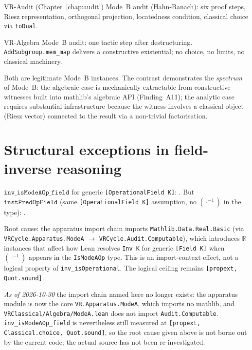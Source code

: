\begin{remark}
\label{rem:modeB_contrast}
\leanok
{}
VR-Audit (Chapter~\ref{chap:audit}) Mode~B audit (Hahn-Banach): six
proof steps, Riesz representation, orthogonal projection, locatedness
condition, classical choice via \texttt{toDual}.

VR-Algebra Mode~B audit: one tactic step after destructuring.
\texttt{AddSubgroup.mem\_map} delivers a constructive existential;
no choice, no limits, no classical machinery.

Both are legitimate Mode~B instances.  The contrast demonstrates the
\emph{spectrum} of Mode~B: the algebraic case is mechanically extractable
from constructive witnesses built into mathlib's algebraic API (Finding~A11);
the analytic case requires substantial infrastructure because the witness
involves a classical object (Riesz vector) connected to the result via
a non-trivial factorisation.
\end{remark}

\section{Structural exceptions in field-inverse reasoning}
\label{sec:algebra_exceptions}

\begin{remark}
\label{rem:A15}
\leanok
{}
$\texttt{inv\_isModeAOp\_field}$ for generic \texttt{[OperationalField K]}:
.
But $\texttt{instPredOpField}$ (same \texttt{[OperationalField K]} assumption,
no $({\cdot}^{-1})$ in the type): .

Root cause: the apparatus import chain imports
\texttt{Mathlib.Data.Real.Basic} (via
\texttt{VRCycle.Apparatus.ModeA} $\to$ \texttt{VRCycle.Audit.Computable}),
which introduces $\mathbb{R}$ instances that affect how Lean resolves
\texttt{Inv K} for generic \texttt{[Field K]} when $({\cdot}^{-1})$
appears in the \texttt{IsModeAOp} type.
This is an import-context effect, not a logical property of
\texttt{inv\_isOperational}.  The logical ceiling remains
\texttt{[propext, Quot.sound]}.

\emph{As of 2026-10-30} the import chain named here no longer exists: the apparatus
module is now the core \texttt{VR.Apparatus.ModeA}, which imports no mathlib, and
\texttt{VRClassical/Algebra/ModeA.lean} does not import \texttt{Audit.Computable}.
\texttt{inv\_isModeAOp\_field} is nevertheless still measured at
\texttt{[propext, Classical.choice, Quot.sound]}, so the root cause given above is not
borne out by the current code; the actual source has not been re-investigated.
\end{remark}


